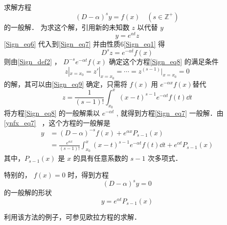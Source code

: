 \begin{example}{}
求解方程
\begin{equation}\label{Sign_eq7}
(D-\alpha)^sy=f(x) \quad (s\in \mathbb{Z}^{+})
\end{equation}
的一般解．
为求这个解，引用新的未知数 $z$ 以代替 $y$
\begin{equation}\label{Sign_eq6}
y=e^{\alpha t}z
\end{equation}
\autoref{Sign_eq6} 代入到\autoref{Sign_eq7} 并由性质6\autoref{Sign_eq1} 得
\begin{equation}\label{Sign_eq8}
D^sz=e^{-\alpha t}f(x)
\end{equation}
则由\autoref{Sign_def2} ， $D^{-s}e^{-\alpha t}f(x)$ 确定这个方程\autoref{Sign_eq8} 的满足条件
\begin{equation}
z|_{x=x_0}=z'|_{x=x_0}=\cdots=z^{(s-1)}|_{x=x_0}=0
\end{equation}
的解，其可以由\autoref{Sign_eq9} 确定，只需将 $f(x)$ 用 $e^{-\alpha x}f(x)$替代
\begin{equation}
z=\frac{1}{(s-1)!}\int_{x_0}^x(x-t)^{s-1}e^{-\alpha t}f(t)\dd t
\end{equation}
将方程\autoref{Sign_eq8} 的一般解乘以 $e^{-\alpha t}$ , 就得到方程\autoref{Sign_eq7} 一般解．由\autoref{ynfx_eq7}~ ，这个方程的一般解是
\begin{equation}
\begin{aligned}
y&=(D-\alpha)^{-s}f(x)+e^{\alpha x}P_{s-1}(x)\\
&=\frac{e^{\alpha x}}{(s-1)!}\int_{x_0}^x(x-t)^{s-1}e^{-\alpha t}f(t)\dd t+e^{\alpha t}P_{s-1}(x)
\end{aligned}
\end{equation}
其中，$P_{s-1}(x)$ 是 $x$ 的具有任意系数的 $s-1$ 次多项式．

特别的， $f(x)=0$ 时，得到方程
\begin{equation}
(D-\alpha)^sy=0
\end{equation}
的一般解的形状
\begin{equation}
y=e^{\alpha t}P_{s-1}(x)
\end{equation}

\end{example}
利用该方法的例子，可参见欧拉方程的求解．
